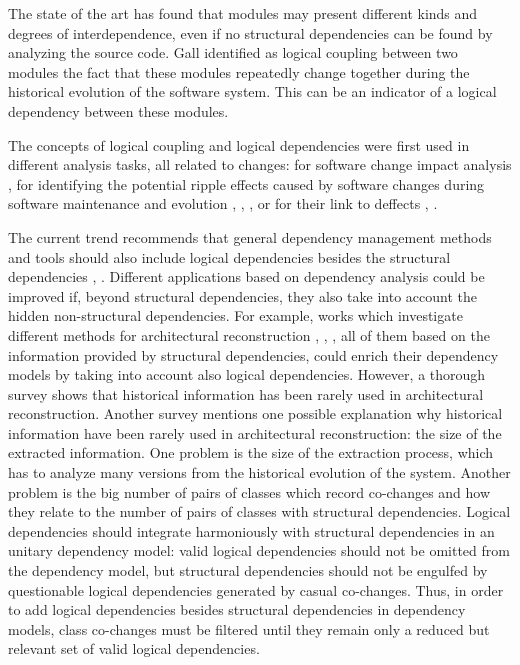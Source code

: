 \documentclass[a4paper,twoside]{article}
\begin{document}
The state of the art has found that modules may present different kinds and degrees of interdependence, even if no structural dependencies can be found by analyzing the source code. Gall \cite{Gall:1998:DLC:850947.853338} identified as logical coupling between two modules the fact that these modules repeatedly change together during the historical evolution of the software system. This can be an indicator of a logical dependency between these modules.

The concepts of logical coupling and logical dependencies were first used in different analysis tasks, all related to changes: for software change impact analysis \cite{1553643}, for identifying the potential ripple effects caused by software changes during software maintenance and evolution \cite{DBLP:conf/issre/OlivaG15}, \cite{Oliva:2011:ISL:2067853.2068086}, \cite{Poshyvanyk2009}, \cite{posh2010} or for their link to deffects \cite{wiese}, \cite{Zimmermann:2004:MVH:998675.999460}.

The current trend recommends that general dependency management methods and tools should also include logical dependencies besides the structural dependencies \cite{Oliva:2011:ISL:2067853.2068086}, \cite{DBLP:journals/jss/AjienkaC17}. Different applications based on dependency analysis could be improved if, beyond structural dependencies, they also take into account the hidden non-structural dependencies. For example, works  which investigate different methods for architectural reconstruction \cite{SoraConti}, \cite{SoraSem13}, \cite{PagerankENASE},  all of them based on the information provided by structural dependencies, could enrich their dependency models by taking into account also logical dependencies. However, a thorough survey \cite{sar} shows that historical information has been rarely used in architectural reconstruction. Another survey \cite{Shtern:2012:CMS:2332427.2332428} mentions one possible explanation why historical information have been rarely used in architectural reconstruction: the size of the extracted information. One problem is the size of the extraction process, which has to analyze many versions from the historical evolution of the system. Another problem is the big number of pairs of classes which record co-changes and how they relate to the number of pairs of classes with structural dependencies. Logical dependencies should integrate harmoniously with structural dependencies in an unitary dependency model: valid logical dependencies should not be omitted from the dependency model, but structural dependencies should not be engulfed by questionable logical dependencies generated by casual co-changes.  
Thus, in order to add logical dependencies besides structural dependencies in dependency models, class co-changes must be filtered until they remain only a reduced but relevant set of valid logical dependencies. 
\end{document}

